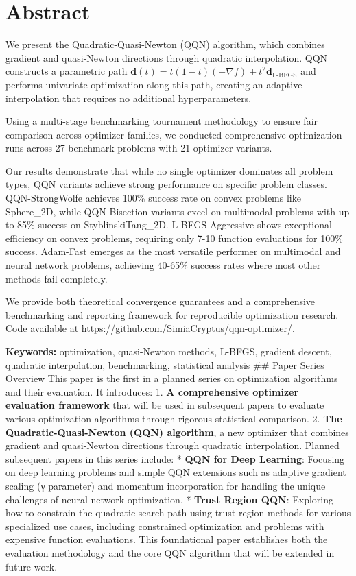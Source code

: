 \hypertarget{abstract}{%
\section{Abstract}\label{abstract}}

We present the Quadratic-Quasi-Newton (QQN) algorithm, which combines gradient and quasi-Newton directions through quadratic interpolation.
QQN constructs a parametric path \(\mathbf{d}(t) = t(1-t)(-\nabla f) + t^2 \mathbf{d}_{\text{L-BFGS}}\) and performs univariate optimization along this path, creating an adaptive interpolation that requires no additional hyperparameters.

Using a multi-stage benchmarking tournament methodology to ensure fair comparison across optimizer families, we conducted comprehensive optimization runs across 27 benchmark problems with 21 optimizer variants.

Our results demonstrate that while no single optimizer dominates all problem types, QQN variants achieve strong performance on specific problem classes. QQN-StrongWolfe achieves 100\% success rate on convex problems like Sphere\_2D, while QQN-Bisection variants excel on multimodal problems with up to 85\% success on StyblinskiTang\_2D. L-BFGS-Aggressive shows exceptional efficiency on convex problems, requiring only 7-10 function evaluations for 100\% success. Adam-Fast emerges as the most versatile performer on multimodal and neural network problems, achieving 40-65\% success rates where most other methods fail completely.

We provide both theoretical convergence guarantees and a comprehensive benchmarking and reporting framework for reproducible optimization research.
Code available at https://github.com/SimiaCryptus/qqn-optimizer/.

\textbf{Keywords:} optimization, quasi-Newton methods, L-BFGS, gradient descent, quadratic interpolation, benchmarking, statistical analysis
\#\# Paper Series Overview
This paper is the first in a planned series on optimization algorithms and their evaluation. It introduces:
1. \textbf{A comprehensive optimizer evaluation framework} that will be used in subsequent papers to evaluate various optimization algorithms through rigorous statistical comparison.
2. \textbf{The Quadratic-Quasi-Newton (QQN) algorithm}, a new optimizer that combines gradient and quasi-Newton directions through quadratic interpolation.
Planned subsequent papers in this series include:
* \textbf{QQN for Deep Learning}: Focusing on deep learning problems and simple QQN extensions such as adaptive gradient scaling (γ parameter) and momentum incorporation for handling the unique challenges of neural network optimization.
* \textbf{Trust Region QQN}: Exploring how to constrain the quadratic search path using trust region methods for various specialized use cases, including constrained optimization and problems with expensive function evaluations.
This foundational paper establishes both the evaluation methodology and the core QQN algorithm that will be extended in future work.

